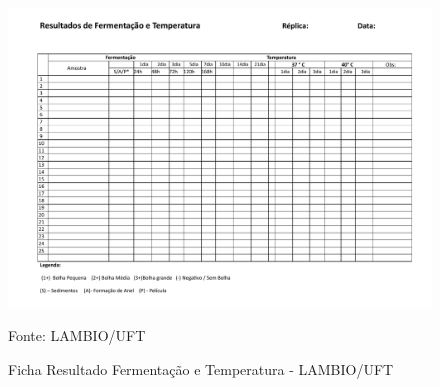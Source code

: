 \documentclass[tcc2]{classe_uftex/uftex}
\begin{document}
\begin{figure}[ht]
    \centering
      \includegraphics[scale=0.6, angle=270]{TCC_Johnny/pdf/ficha_Fermentacao.pdf}
      \label{ape:ficha_fermentacao}
      \caption{Ficha Resultado Fermentação e Temperatura - LAMBIO/UFT}
       \raggedright \scriptsize \centering  Fonte: LAMBIO/UFT
    \end{figure}%


\end{document}
